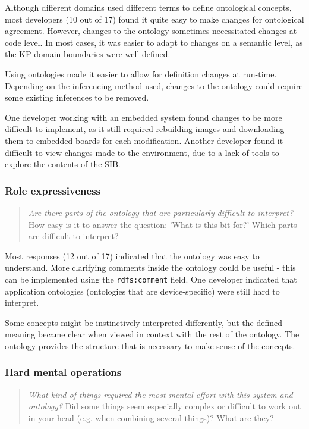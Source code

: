 Although different domains used different terms to define ontological concepts, most developers (10 out of 17) found it quite easy to make changes for ontological agreement. However, changes to the ontology sometimes necessitated changes at code level. In most cases, it was easier to adapt to changes on a semantic level, as the \ac{KP} domain boundaries were well defined.

Using ontologies made it easier to allow for definition changes at run-time. Depending on the inferencing method used, changes to the ontology could require some existing inferences to be removed. 

One developer working with an embedded system found changes to be more difficult to implement, as it still required rebuilding images and downloading them to embedded boards for each modification. Another developer found it difficult to view changes made to the environment, due to a lack of tools to explore the contents of the \ac{SIB}.


\subsubsection{Role expressiveness}

\begin{quote}
	\emph{Are there parts of the ontology that are particularly difficult to interpret?}
	How easy is it to answer the question: 'What is this bit for?' Which parts are difficult to interpret?
\end{quote}

Most responses (12 out of 17) indicated that the ontology was easy to understand. More clarifying comments inside the ontology could be useful - this can be implemented using the \texttt{rdfs:comment} field. One developer indicated that application ontologies (ontologies that are device-specific) were still hard to interpret. 

Some concepts might be instinctively interpreted differently, but the defined meaning became clear when viewed in context with the rest of the ontology. The ontology provides the structure that is necessary to make sense of the concepts.


\subsubsection{Hard mental operations}

\begin{quote}
	\emph{What kind of things required the most mental effort with this system and ontology?}
	Did some things seem especially complex or difficult to work out in your head (e.g. when combining several things)? What are they?
\end{quote}

